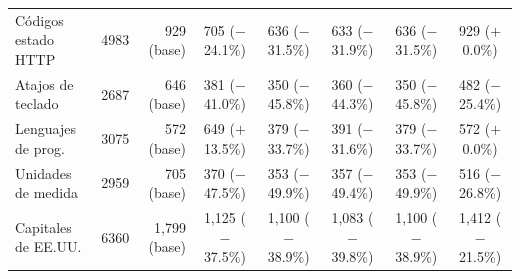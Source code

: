 \begin{table}[htbp]
\begin{tabular}{@{}lcrccccc@{}}
    Códigos estado HTTP & 4983 & 929 {\scriptsize (base)} & 705 {\scriptsize ($-$24.1\%)} & 636 {\scriptsize ($-$31.5\%)} & 633 {\scriptsize ($-$31.9\%)} & 636 {\scriptsize ($-$31.5\%)} & 929 {\scriptsize ($+$0.0\%)} \\
    Atajos de teclado & 2687 & 646 {\scriptsize (base)} & 381 {\scriptsize ($-$41.0\%)} & 350 {\scriptsize ($-$45.8\%)} & 360 {\scriptsize ($-$44.3\%)} & 350 {\scriptsize ($-$45.8\%)} & 482 {\scriptsize ($-$25.4\%)} \\
    Lenguajes de prog. & 3075 & 572 {\scriptsize (base)} & 649 {\scriptsize ($+$13.5\%)} & 379 {\scriptsize ($-$33.7\%)} & 391 {\scriptsize ($-$31.6\%)} & 379 {\scriptsize ($-$33.7\%)} & 572 {\scriptsize ($+$0.0\%)} \\
    Unidades de medida & 2959 & 705 {\scriptsize (base)} & 370 {\scriptsize ($-$47.5\%)} & 353 {\scriptsize ($-$49.9\%)} & 357 {\scriptsize ($-$49.4\%)} & 353 {\scriptsize ($-$49.9\%)} & 516 {\scriptsize ($-$26.8\%)} \\
    Capitales de EE.UU. & 6360 & 1,799 {\scriptsize (base)} & 1,125 {\scriptsize ($-$37.5\%)} & 1,100 {\scriptsize ($-$38.9\%)} & 1,083 {\scriptsize ($-$39.8\%)} & 1,100 {\scriptsize ($-$38.9\%)} & 1,412 {\scriptsize ($-$21.5\%)} \\
    \bottomrule
  \end{tabular}
\end{table}

